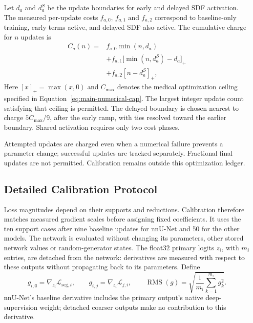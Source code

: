 \documentclass[12pt,a4paper]{article}
\begin{document}
Let $d_a$ and $d_a^S$ be the update boundaries for early and delayed
SDF activation. The measured per-update costs $f_{a,0}$, $f_{a,1}$
and $f_{a,2}$ correspond to baseline-only training, early terms active,
and delayed SDF also active. The cumulative charge for $n$ updates is
\begin{equation}
\begin{aligned}
C_a(n)={}&f_{a,0}\min(n,d_a)\\
 &+f_{a,1}\bigl[\min(n,d_a^S)-d_a\bigr]_+\\
 &+f_{a,2}[n-d_a^S]_+,
\end{aligned}
\label{eq:piecewise-optimization-cost}
\end{equation}
Here $[x]_+=\max(x,0)$ and $C_{\max}$ denotes the medical optimization
ceiling specified in Equation~\ref{eq:main-numerical-cap}. The largest
integer update count satisfying that ceiling is permitted. The delayed boundary is chosen nearest
to charge $5C_{\max}/9$, after the early ramp, with ties resolved
toward the earlier boundary. Shared activation requires only two
cost phases.

Attempted updates are charged even when a numerical failure prevents
a parameter change; successful updates are tracked separately.
Fractional final updates are not permitted. Calibration remains
outside this optimization ledger.

\clearpage

\subsection{Detailed Calibration Protocol}\label{sec:detailed-calibration}

Loss magnitudes depend on their supports and reductions. Calibration
therefore matches measured gradient scales before assigning fixed
coefficients. It uses the ten support cases after nine
baseline updates for nnU-Net and 50 for the other models. The network
is evaluated without changing its parameters, other stored network
values or random-generator states. The float32 primary logits $z_i$, with $m_i$ entries, are detached
from the network: derivatives are measured with respect to these outputs
without propagating back to its parameters. Define
\begin{equation}
g_{i,0}=\nabla_{z_i}\mathcal{L}_{\mathrm{seg},i},
\qquad
g_{i,j}=\nabla_{z_i}\mathcal{L}_{j,i},
\qquad
\operatorname{RMS}(g)=
\sqrt{\frac{1}{m_i}\sum_{k=1}^{m_i}g_k^2}.
\label{eq:calibration-logit-gradients}
\end{equation}
nnU-Net's baseline derivative includes the primary output's native
deep-supervision weight; detached coarser outputs make no contribution
to this derivative.
\end{document}
